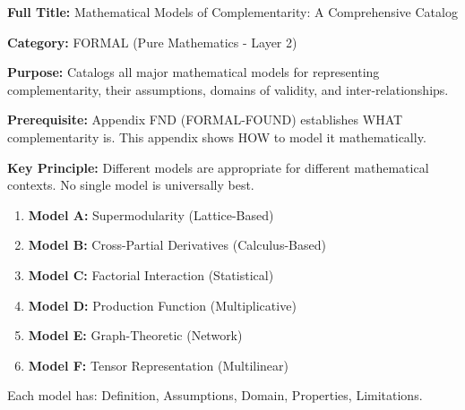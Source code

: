 \begin{tcolorbox}[colback=blue!5!white,colframe=blue!75!black,title=\textbf{Appendix MDL: FORMAL-MODELS}]
\textbf{Full Title:} Mathematical Models of Complementarity: A Comprehensive Catalog

\textbf{Category:} FORMAL (Pure Mathematics - Layer 2)

\textbf{Purpose:} Catalogs all major mathematical models for representing complementarity, their assumptions, domains of validity, and inter-relationships.

\textbf{Prerequisite:} Appendix FND (FORMAL-FOUND) establishes WHAT complementarity is. This appendix shows HOW to model it mathematically.

\textbf{Key Principle:} Different models are appropriate for different mathematical contexts. No single model is universally best.
\end{tcolorbox}

\begin{tcolorbox}[colback=gray!5!white,colframe=gray!75!black,title=\textbf{The Six Canonical Models}]
\small
\begin{enumerate}[noitemsep]
    \item \textbf{Model A:} Supermodularity (Lattice-Based)
    \item \textbf{Model B:} Cross-Partial Derivatives (Calculus-Based)
    \item \textbf{Model C:} Factorial Interaction (Statistical)
    \item \textbf{Model D:} Production Function (Multiplicative)
    \item \textbf{Model E:} Graph-Theoretic (Network)
    \item \textbf{Model F:} Tensor Representation (Multilinear)
\end{enumerate}

Each model has: Definition, Assumptions, Domain, Properties, Limitations.
\end{tcolorbox}

